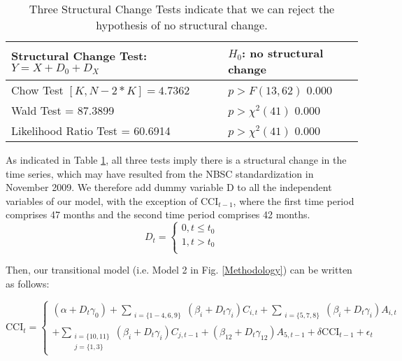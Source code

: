 \documentclass[10pt]{article}
\begin{document}
\begin {table}
\begin {center}
\begin {tabular} {ll}
\hline
Structural Change Test:  $Y = X + D_0 + D_X$	&	$H_0$: no structural change	\\
\hline
Chow Test $[K, N-2*K] = 4.7362$	                         &	$p > F(13 , 62)$   0.000	\\
Wald Test = 87.3899	                                                  &	$p > \chi^2(41)$    0.000	\\
Likelihood Ratio Test = 60.6914	                                 &	$p > \chi^2(41)$    0.000	\\
\hline
\end {tabular}
\caption{\label {SCT_results}Three Structural Change Tests indicate that we can reject the hypothesis of no structural change.}
\end {center}
\end {table}



As indicated in Table \ref{SCT_results}, all three tests imply there is a structural change in the time series, which may have resulted from the NBSC standardization in November 2009.
We therefore add dummy variable D to all the independent variables of our model, with the exception of $\mbox{CCI}_{t-1}$, where the first time period comprises 47 months and the second time period comprises 42 months.\\

\begin{equation}
D_t=
\begin{cases}
  0,t\leq t_0\\
  1, t>t_0\\
\end{cases}
\end{equation} 


Then, our transitional model (i.e. Model 2 in Fig. \ref{Methodology}) can be written as follows:

\begin {equation}
\mbox{CCI}_t=
\begin{cases}
 (\alpha+D_t\gamma_0) +  \sum_{\substack{i=\{1-4, 6,9\}}} (\beta_i + D_t\gamma_i) C_{i,t} + \sum_{\substack{i=\{5,7,8\}}} (\beta_i + D_t\gamma_i) A_{i,t}\\
 + \sum_{\substack{i=\{10,11\}\\
			      j=\{1,3\}}} (\beta_i + D_t \gamma_i)C_{j,t-1} + (\beta_{12} + D_t \gamma_{12})A_{5,t-1} + \delta \mbox{CCI}_{t-1}+ \epsilon_t
\end{cases}
\label{model}
\end {equation}
\end{document}
